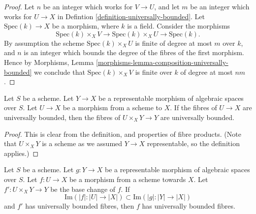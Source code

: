 \begin{proof}
Let $n$ be an integer which works for $V \to U$, and let $m$ be
an integer which works for $U \to X$ in
Defintion \ref{definition-universally-bounded}.
Let $\text{Spec}(k) \to X$ be a morphism, where $k$ is a field.
Consider the morphisms
$$
\text{Spec}(k) \times_X V
\longrightarrow
\text{Spec}(k) \times_X U
\longrightarrow
\text{Spec}(k).
$$
By assumption the scheme $\text{Spec}(k) \times_X U$
is finite of degree at most $m$ over $k$, and $n$ is an integer which
bounds the degree of the fibres of the first morphism. Hence by
Morphisms, Lemma \ref{morphisms-lemma-composition-universally-bounded}
we conclude that $\text{Spec}(k) \times_X V$ is finite over $k$
of degree at most $nm$.
\end{proof}

\begin{lemma}
\label{lemma-base-change-universally-bounded}
Let $S$ be a scheme.
Let $Y \to X$ be a representable morphism of algebraic spaces over $S$.
Let $U \to X$ be a morphism from a scheme to $X$.
If the fibres of $U \to X$ are universally bounded, then the fibres
of $U \times_X Y \to Y$ are universally bounded.
\end{lemma}

\begin{proof}
This is clear from the definition, and properties of fibre products.
(Note that $U \times_X Y$ is a scheme
as we assumed $Y \to X$ representable, so the definition applies.)
\end{proof}

\begin{lemma}
\label{lemma-descent-universally-bounded}
Let $S$ be a scheme. Let $g : Y \to X$ be a representable morphism of
algebraic spaces over $S$. Let $f : U \to X$ be a morphism from a scheme
towards $X$. Let $f' : U \times_X Y \to Y$ be the base change of $f$.
If
$$
\text{Im}(|f| : |U| \to |X|) \subset \text{Im}(|g| : |Y| \to |X|)
$$
and $f'$ has universally bounded fibres, then $f$ has universally
bounded fibres.
\end{lemma}

